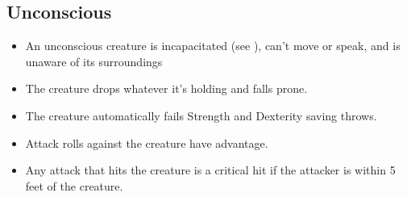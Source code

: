 \subsection{Unconscious\label{condition:unconscious}}
\begin{itemize}
\item An unconscious creature is incapacitated (see ), can't move or speak, and is unaware of its surroundings
\item The creature drops whatever it's holding and falls prone.
\item The creature automatically fails Strength and Dexterity saving throws.
\item Attack rolls against the creature have advantage.
\item Any attack that hits the creature is a critical hit if the attacker is within 5 feet of the creature.
\end{itemize}